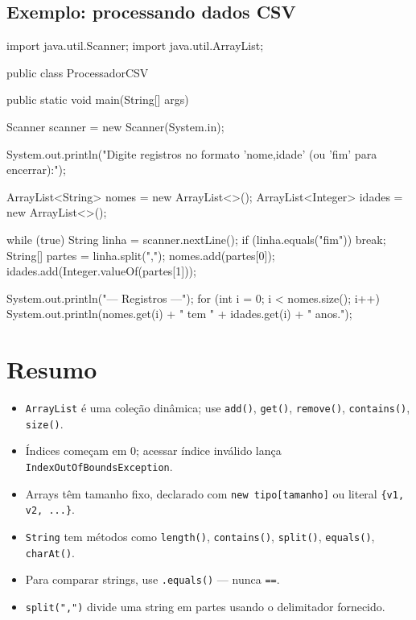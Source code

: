 \documentclass[12pt, a4paper]{article}
\newcommand{\code}[1]{\texttt{\color{javaDeep}#1}}
\begin{document}
\subsection{Exemplo: processando dados CSV}

\begin{javacode}
import java.util.Scanner;
import java.util.ArrayList;

public class ProcessadorCSV {
    public static void main(String[] args) {
        Scanner scanner = new Scanner(System.in);

        System.out.println("Digite registros no formato 'nome,idade' (ou 'fim' para encerrar):");

        ArrayList<String> nomes = new ArrayList<>();
        ArrayList<Integer> idades = new ArrayList<>();

        while (true) {
            String linha = scanner.nextLine();
            if (linha.equals("fim")) {
                break;
            }
            String[] partes = linha.split(",");
            nomes.add(partes[0]);
            idades.add(Integer.valueOf(partes[1]));
        }

        System.out.println("\n--- Registros ---");
        for (int i = 0; i < nomes.size(); i++) {
            System.out.println(nomes.get(i) + " tem " + idades.get(i) + " anos.");
        }
    }
}
\end{javacode}

\section{Resumo}

\begin{itemize}
  \item \code{ArrayList} é uma coleção dinâmica; use \code{add()}, \code{get()}, \code{remove()}, \code{contains()}, \code{size()}.
  \item Índices começam em 0; acessar índice inválido lança \code{IndexOutOfBoundsException}.
  \item Arrays têm tamanho fixo, declarado com \code{new tipo[tamanho]} ou literal \code{\{v1, v2, ...\}}.
  \item \code{String} tem métodos como \code{length()}, \code{contains()}, \code{split()}, \code{equals()}, \code{charAt()}.
  \item Para comparar strings, use \code{.equals()} --- nunca \code{==}.
  \item \code{split(",")} divide uma string em partes usando o delimitador fornecido.
\end{itemize}
\end{document}
